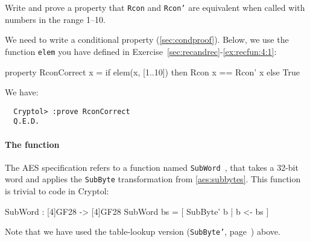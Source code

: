 \begin{Exercise}\label{ex:aeskerc:1}
  Write and prove a property that {\tt Rcon} and {\tt Rcon'} are
  equivalent when called with numbers in the range 1--10.
\end{Exercise}
\begin{Answer}
  We need to write a conditional property
  (\autoref{sec:condproof})\indThmCond. Below, we use the function
  {\tt elem} you have defined in
  Exercise~\ref{sec:recandrec}-\ref{ex:recfun:4:1}:\indElem
\begin{code}
  property RconCorrect x = if elem(x, [1..10])
                           then Rcon x == Rcon' x
                           else True
\end{code}
We have:
\begin{Verbatim}
  Cryptol> :prove RconCorrect
  Q.E.D.
\end{Verbatim}
\end{Answer}


\paragraph*{The {} function} The AES\indAES
specification refers to a function named {\tt SubWord}~\cite[section
5.2]{aes}, that takes a 32-bit word and applies the {\tt SubByte}
transformation from \autoref{aes:subbytes}. This function is
trivial to code in Cryptol:
\begin{code}
  SubWord : [4]GF28 -> [4]GF28
  SubWord bs = [ SubByte' b | b <- bs ]
\end{code}
Note that we have used the table-lookup version ({\tt SubByte'},
page~\pageref{aes:subbytetl}) above.

